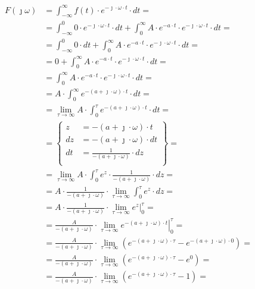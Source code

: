 \begin{task}
\begin{align*}
F(\jmath \omega )&=\int_{-\infty }^{\infty}f(t) \cdot e^{-\jmath \cdot \omega \cdot t}\cdot dt=\\
&=\int_{-\infty}^{0} 0 \cdot e^{-\jmath \cdot \omega \cdot t}\cdot dt
+\int_{0}^{\infty} A \cdot e^{-a \cdot t} \cdot e^{-\jmath \cdot \omega \cdot t}\cdot dt=\\
&=\int_{-\infty}^{0} 0 \cdot dt
+\int_{0}^{\infty} A \cdot e^{-a \cdot t} \cdot e^{-\jmath \cdot \omega \cdot t}\cdot dt=\\
&=0 +\int_{0}^{\infty} A \cdot e^{-a \cdot t} \cdot e^{-\jmath \cdot \omega \cdot t}\cdot dt=\\
&=\int_{0}^{\infty} A \cdot e^{-a \cdot t} \cdot e^{-\jmath \cdot \omega \cdot t}\cdot dt=\\
&=A\cdot \int_{0}^{\infty} e^{-( a + \jmath \cdot \omega) \cdot t}\cdot dt=\\
&=\lim_{\tau \rightarrow \infty} A\cdot \int_{0}^{\tau} e^{-( a + \jmath \cdot \omega) \cdot t}\cdot dt=\\
&=\begin{Bmatrix}
z&=-( a + \jmath \cdot \omega) \cdot t\\
dz&=-( a + \jmath \cdot \omega) \cdot dt\\
dt&=\frac{1}{-( a + \jmath \cdot \omega)} \cdot dz\\
\end{Bmatrix}=\\
&=\lim_{\tau \rightarrow \infty} A\cdot \int_{0}^{\tau} e^{z}\cdot \frac{1}{-( a + \jmath \cdot \omega)} \cdot dz=\\
&=A\cdot \frac{1}{-( a + \jmath \cdot \omega)}\cdot \lim_{\tau \rightarrow \infty} \int_{0}^{\tau} e^{z} \cdot dz=\\
&=A\cdot \frac{1}{-( a + \jmath \cdot \omega)}\cdot \lim_{\tau \rightarrow \infty} \left. e^{z} \right|_{0}^{\tau}=\\
&=\frac{A}{-( a + \jmath \cdot \omega)}\cdot \lim_{\tau \rightarrow \infty} \left. e^{-( a + \jmath \cdot \omega) \cdot t} \right|_{0}^{\tau}=\\
&=\frac{A}{-( a + \jmath \cdot \omega)} \cdot \lim_{\tau \rightarrow \infty} \left(e^{-( a + \jmath \cdot \omega) \cdot \tau} - e^{-( a + \jmath \cdot \omega) \cdot 0}\right)=\\
&=\frac{A}{-( a + \jmath \cdot \omega)} \cdot \lim_{\tau \rightarrow \infty} \left(e^{-( a + \jmath \cdot \omega) \cdot \tau} - e^{0}\right)=\\
&=\frac{A}{-( a + \jmath \cdot \omega)} \cdot \lim_{\tau \rightarrow \infty} \left(e^{-( a + \jmath \cdot \omega) \cdot \tau} - 1\right)=\\

\end{align*}
\end{task}
